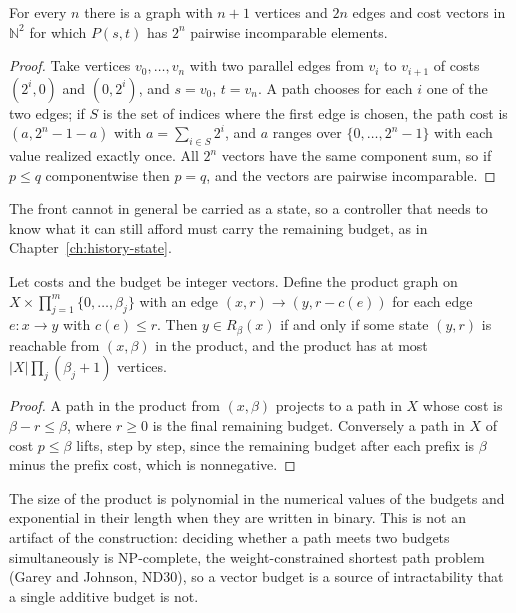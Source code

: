\begin{newresult}\label{prop:pareto}
For every $n$ there is a graph with $n+1$ vertices and $2n$ edges and cost vectors in $\mathbb N^{2}$ for which $P(s,t)$ has $2^{n}$ pairwise incomparable elements.
\end{newresult}
\begin{proof}
Take vertices $v_0,\dots,v_n$ with two parallel edges from $v_i$ to $v_{i+1}$ of costs $(2^{i},0)$ and $(0,2^{i})$, and $s=v_0$, $t=v_n$. A path chooses for each $i$ one of the two edges; if $S$ is the set of indices where the first edge is chosen, the path cost is $(a,2^{n}-1-a)$ with $a=\sum_{i\in S}2^{i}$, and $a$ ranges over $\{0,\dots,2^{n}-1\}$ with each value realized exactly once. All $2^n$ vectors have the same component sum, so if $p\le q$ componentwise then $p=q$, and the vectors are pairwise incomparable.
\end{proof}

The front cannot in general be carried as a state, so a controller that needs to know what it can still afford must carry the remaining budget, as in Chapter~\ref{ch:history-state}.

\begin{newresult}\label{prop:vector-product}
Let costs and the budget be integer vectors. Define the product graph on $X\times\prod_{j=1}^{m}\{0,\dots,\beta_j\}$ with an edge $(x,r)\to(y,r-c(e))$ for each edge $e:x\to y$ with $c(e)\le r$. Then $y\in R_\beta(x)$ if and only if some state $(y,r)$ is reachable from $(x,\beta)$ in the product, and the product has at most $|X|\prod_j(\beta_j+1)$ vertices.
\end{newresult}
\begin{proof}
A path in the product from $(x,\beta)$ projects to a path in $X$ whose cost is $\beta-r\le\beta$, where $r\ge0$ is the final remaining budget. Conversely a path in $X$ of cost $p\le\beta$ lifts, step by step, since the remaining budget after each prefix is $\beta$ minus the prefix cost, which is nonnegative.
\end{proof}

The size of the product is polynomial in the numerical values of the budgets and exponential in their length when they are written in binary. This is not an artifact of the construction: deciding whether a path meets two budgets simultaneously is NP-complete, the weight-constrained shortest path problem (Garey and Johnson, ND30), so a vector budget is a source of intractability that a single additive budget is not.

